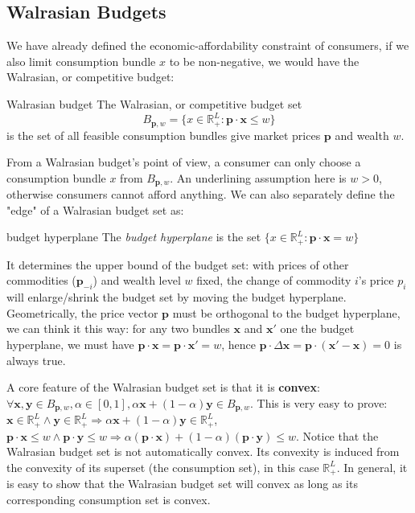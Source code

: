 \subsection{Walrasian Budgets}\label{chap2:sec2:ssec1}
We have already defined the economic-affordability constraint of consumers, if we also limit consumption bundle $x$ to be non-negative, we would have the Walrasian, or competitive budget:

\begin{definition}{Walrasian budget}{}
    The Walrasian, or competitive budget set $$B_{\mathbf{p},w}=\{x\in\mathbb{R}^L_+:\mathbf{p}\cdot\mathbf{x}\leq w\}$$ is the set of all feasible consumption bundles give market prices $\mathbf{p}$ and wealth $w$.
\end{definition}

From a Walrasian budget's point of view, a consumer can only choose a consumption bundle $x$ from $B_{\mathbf{p},w}$. An underlining assumption here is $w>0$, otherwise consumers cannot afford anything. We can also
separately define the "edge" of a Walrasian budget set as:
\begin{definition}{budget hyperplane}{}
    The \textit{budget hyperplane} is the set $\{x\in\mathbb{R}^L_+:\mathbf{p}\cdot\mathbf{x}=w\}$
\end{definition}
It determines the upper bound of the budget set: with prices of other commodities ($\mathbf{p}_{-i}$) and wealth level $w$ fixed, the change of commodity $i$'s price $p_i$ will enlarge/shrink the budget set by moving the budget hyperplane.
Geometrically, the price vector $\mathbf{p}$ must be orthogonal to the budget hyperplane, we can think it this way: for any two bundles $\mathbf{x}$ and $\mathbf{x}'$ one the budget hyperplane, we must have $\mathbf{p}\cdot\mathbf{x}=\mathbf{p}\cdot\mathbf{x}'=w$, hence
$\mathbf{p}\cdot\Delta\mathbf{x}=\mathbf{p}\cdot(\mathbf{x}'-\mathbf{x})=0$ is always true.

A core feature of the Walrasian budget set is that it is \textbf{convex}: $\forall \mathbf{x},\mathbf{y}\in B_{\mathbf{p},w}, \alpha\in[0,1], \alpha\mathbf{x}+(1-\alpha)\mathbf{y}\in B_{\mathbf{p},w}$. This is very easy to prove: $\mathbf{x}\in\mathbb{R}^L_+\land\mathbf{y}\in\mathbb{R}^L_+\Rightarrow \alpha\mathbf{x}+(1-\alpha)\mathbf{y}\in \mathbb{R}^L_+$, $\mathbf{p}\cdot\mathbf{x}\leq w\land\mathbf{p}\cdot \mathbf{y}\leq w\Rightarrow \alpha(\mathbf{p}\cdot\mathbf{x})+(1-\alpha)(\mathbf{p}\cdot\mathbf{y})\leq w$.
Notice that the Walrasian budget set is not automatically convex. Its convexity is induced from the convexity of its superset (the consumption set), in this case $\mathbb{R}^L_+$. In general, it is easy to show that the Walrasian budget set will convex as long as its corresponding consumption set is convex.

